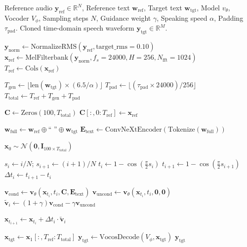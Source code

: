 \begin{algorithm}[htbp]
\caption{Continuous Flow Matching Zero-Shot Voice Synthesis}
\label{alg:cfm_generation}
\begin{algorithmic}[1]
\Require Reference audio $\mathbf{y}_{\text{ref}} \in \mathbb{R}^N$, Reference text $\mathbf{w}_{\text{ref}}$, Target text $\mathbf{w}_{\text{tgt}}$, Model $v_\theta$, Vocoder $V_\phi$, Sampling steps $N$, Guidance weight $\gamma$, Speaking speed $\alpha$, Padding $\tau_{\text{pad}}$.
\Ensure Cloned time-domain speech waveform $\mathbf{y}_{\text{tgt}} \in \mathbb{R}^M$.

\State $\mathbf{y}_{\text{norm}} \gets \text{NormalizeRMS}(\mathbf{y}_{\text{ref}}, \text{target\_rms}=0.10)$
\State $\mathbf{x}_{\text{ref}} \gets \text{MelFilterbank}(\mathbf{y}_{\text{norm}}, f_s=24000, H=256, N_{\text{fft}}=1024)$
\State $T_{\text{ref}} \gets \text{Cols}(\mathbf{x}_{\text{ref}})$

\State $T_{\text{gen}} \gets \lfloor \text{len}(\mathbf{w}_{\text{tgt}}) \times (6.5 / \alpha) \rfloor$
\State $T_{\text{pad}} \gets \lfloor (\tau_{\text{pad}} \times 24000) / 256 \rfloor$
\State $T_{\text{total}} \gets T_{\text{ref}} + T_{\text{gen}} + T_{\text{pad}}$

\State $\mathbf{C} \gets \text{Zeros}(100, T_{\text{total}})$
\State $\mathbf{C}[:, 0 : T_{\text{ref}}] \gets \mathbf{x}_{\text{ref}}$ 

\State $\mathbf{w}_{\text{full}} \gets \mathbf{w}_{\text{ref}} \oplus \text{`` ''} \oplus \mathbf{w}_{\text{tgt}}$
\State $\mathbf{E}_{\text{text}} \gets \text{ConvNeXtEncoder}(\text{Tokenize}(\mathbf{w}_{\text{full}}))$

\State $\mathbf{x}_0 \sim \mathcal{N}(\mathbf{0}, \mathbf{I}_{100 \times T_{\text{total}}})$ 

    \State $s_i \gets i / N$; \quad $s_{i+1} \gets (i+1) / N$
    \State $t_i \gets 1 - \cos(\frac{\pi}{2} s_i)$ 
    \State $t_{i+1} \gets 1 - \cos(\frac{\pi}{2} s_{i+1})$
    \State $\Delta t_i \gets t_{i+1} - t_i$
    
    \State $\mathbf{v}_{\text{cond}} \gets \mathbf{v}_\theta(\mathbf{x}_{t_i}, t_i, \mathbf{C}, \mathbf{E}_{\text{text}})$
    \State $\mathbf{v}_{\text{uncond}} \gets \mathbf{v}_\theta(\mathbf{x}_{t_i}, t_i, \mathbf{0}, \mathbf{0})$
    \State $\tilde{\mathbf{v}}_i \gets (1 + \gamma)\mathbf{v}_{\text{cond}} - \gamma \mathbf{v}_{\text{uncond}}$ 
    
    \State $\mathbf{x}_{t_{i+1}} \gets \mathbf{x}_{t_i} + \Delta t_i \cdot \tilde{\mathbf{v}}_i$ 
\EndFor

\State $\mathbf{x}_{\text{tgt}} \gets \mathbf{x}_1[:, T_{\text{ref}} : T_{\text{total}}]$ 
\State $\mathbf{y}_{\text{tgt}} \gets \text{VocosDecode}(V_\phi, \mathbf{x}_{\text{tgt}})$
\State \Return $\mathbf{y}_{\text{tgt}}$
\end{algorithmic}
\end{algorithm}

